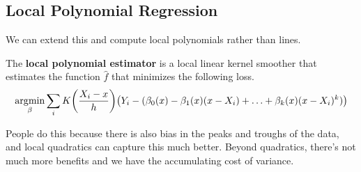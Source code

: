 \subsection{Local Polynomial Regression}

  We can extend this and compute local polynomials rather than lines. 

  \begin{definition}
    The \textbf{local polynomial estimator} is a local linear kernel smoother that estimates the function $\hat{f}$ that minimizes the following loss. 
    \begin{equation}
      \argmin_{\beta} \sum_i K \bigg( \frac{X_i - x}{h} \bigg) \big( Y_i - (\beta_0 (x) - \beta_1 (x) (x- X_i) + \ldots + \beta_k (x) (x - X_i)^k )\big)
    \end{equation}
  \end{definition}

  People do this because there is also bias in the peaks and troughs of the data, and local quadratics can capture this much better. Beyond quadratics, there's not much more benefits and we have the accumulating cost of variance. 
